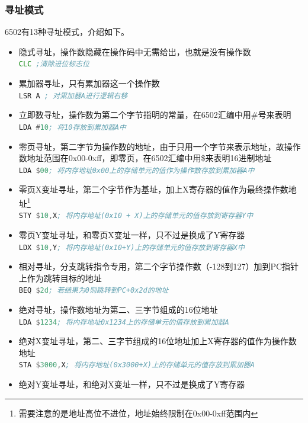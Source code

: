 \documentclass[a4paper]{ltxdoc}
\begin{document}
{\subsubsection{寻址模式}
6502有13种寻址模式，介绍如下。
\begin{itemize}
\item 隐式寻址，操作数隐藏在操作码中无需给出，也就是没有操作数\\
 \mintinline [breaklines]{asm}{CLC ;清除进位标志位}
\item 累加器寻址，只有累加器这一个操作数\\
 \mintinline [breaklines]{asm}{LSR A ; 对累加器A进行逻辑右移}
\item 立即数寻址，操作数为第二个字节指明的常量，在6502汇编中用\#号来表明\\
 \mintinline [breaklines]{asm}{LDA #10; 将10存放到累加器A中}
\item 零页寻址，第二字节为操作数的地址，由于只用一个字节来表示地址，故操作数地址范围在0x00-0xff，即零页，在6502汇编中用\$来表明16进制地址\\
 \mintinline [breaklines]{asm}{LDA $00; 将内存地址0x00上的存储单元的值作为操作数存放到累加器A中}
\item 零页X变址寻址，第二个字节作为基址，加上X寄存器的值作为最终操作数地址\footnote{需要注意的是地址高位不进位，地址始终限制在0x00-0xff范围内}\\
 \mintinline [breaklines]{asm}{STY $10,X; 将内存地址(0x10 + X)上的存储单元的值存放到寄存器Y中}
\item 零页Y变址寻址，和零页X变址一样，只不过是换成了Y寄存器\\
 \mintinline [breaklines]{asm}{LDX $10,Y; 将内存地址(0x10+Y)上的存储单元的值存放到寄存器X中}
\item 相对寻址，分支跳转指令专用，第二个字节操作数（-128到127）加到PC指针上作为跳转目标的地址\\
 \mintinline [breaklines]{asm}{BEQ $2d; 若结果为0则跳转到PC+0x2d的地址}
\item 绝对寻址，操作数地址为第二、三字节组成的16位地址\\
 \mintinline [breaklines]{asm}{LDA $1234; 将内存地址0x1234上的存储单元的值存放到累加器A}
\item 绝对X变址寻址，第二、三字节组成的16位地址加上X寄存器的值作为操作数地址\\
 \mintinline [breaklines]{asm}{STA $3000,X; 将内存地址(0x3000+X)上的存储单元的值存放到累加器A}
\item 绝对Y变址寻址，和绝对X变址一样，只不过是换成了Y寄存器\\

\end{itemize}}
\end{document}
